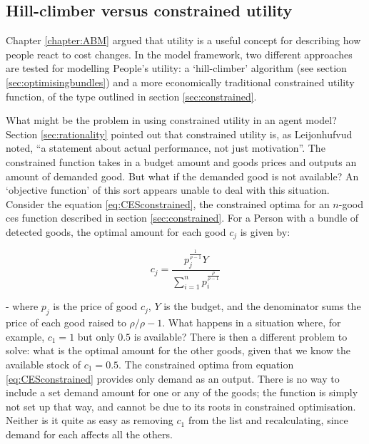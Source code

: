 \subsection{Hill-climber versus constrained utility \label{sec:greedyvsconstrained}}

Chapter \ref{chapter:ABM} argued that utility is a useful concept for describing how people react to cost changes. In the model framework, two different approaches are tested for modelling People's utility: a `hill-climber' algorithm (see section \ref{sec:optimisingbundles}) and a more economically traditional constrained utility function, of the type outlined in section \ref{sec:constrained}.

What might be the problem in using constrained utility in an agent model? Section \ref{sec:rationality} pointed out that constrained utility is, as Leijonhufvud noted, ``a statement about actual performance, not just motivation''. The constrained function takes in a budget amount and goods prices and outputs an amount of demanded good. But what if the demanded good is not available? An `objective function' of this sort appears unable to deal with this situation. Consider the equation \eqref{eq:CESconstrained}, the constrained optima for an $n$-good \gls{ces} function described in section \ref{sec:constrained}. For a Person with a bundle of detected goods, the optimal amount for each good $c_j$ is given by:

\begin{equation}
c_j = \frac{p_j^\frac{1}{\rho-1}Y}{\sum_{i=1}^{n}p_i^\frac{\rho}{\rho-1}} \label{eq:CESconstrained2}
\end{equation}

 - where $p_j$ is the price of good $c_j$, $Y$ is the budget, and the denominator sums the price of each good raised to $\rho/\rho-1$. What happens in a situation where, for example, $c_1 = 1$ but only $0.5$ is available? There is then a different problem to solve: what is the optimal amount for the other goods, given that we know the available stock of  $c_1 = 0.5$. The constrained optima from equation \eqref{eq:CESconstrained} provides only demand as an output. There is no way to include a set demand amount for one or any of the goods; the function is simply not set up that way, and cannot be due to its roots in constrained optimisation. Neither is it quite as easy as removing $c_1$ from the list and recalculating, since demand for each affects all the others.

